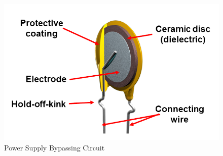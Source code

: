 \begin{figure}
\includegraphics[keepaspectratio=true,scale=.5]{./figures/parameters/bypass.png}
\centering
\caption{Power Supply Bypassing Circuit}
\label{bypass}
\end{figure}
